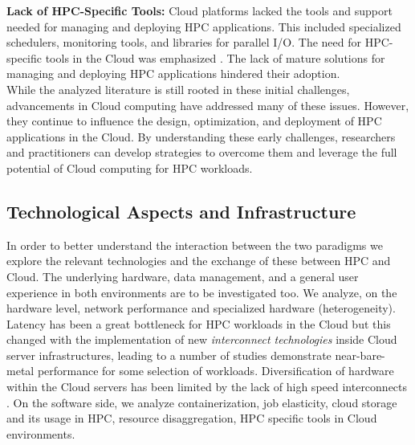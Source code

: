     \noindent
    \textbf{Lack of HPC-Specific Tools:} Cloud platforms lacked the tools and support needed for managing and deploying HPC applications. This included specialized schedulers, monitoring tools, and libraries for parallel I/O. The need for HPC-specific tools in the Cloud was emphasized \cite{yelick2011challenges, gupta2014challenges}. The lack of mature solutions for managing and deploying HPC applications hindered their adoption. \\

    While the analyzed literature is still rooted in these initial challenges, advancements in Cloud computing have addressed many of these issues. However, they continue to influence the design, optimization, and deployment of HPC applications in the Cloud. By understanding these early challenges, researchers and practitioners can develop strategies to overcome them and leverage the full potential of Cloud computing for HPC workloads.





\subsection{Technological Aspects and Infrastructure}
\label{sec:techinfrastructure}

    In order to better understand the interaction between the two paradigms we explore the relevant technologies and the exchange of these between HPC and Cloud. The underlying hardware, data management, and a general user experience in both environments are to be investigated too.
    We analyze, on the hardware level, network performance and specialized hardware (heterogeneity). Latency has been a great bottleneck for HPC workloads in the Cloud but this changed with the implementation of new \textit{interconnect technologies} inside Cloud server infrastructures, leading to a number of studies demonstrate near-bare-metal performance for some selection of workloads. Diversification of hardware within the Cloud servers has been limited by the lack of high speed interconnects \cite{alves_interference-aware_2020}\cite{michelogiannakis_case_2022}.
    On the software side, we analyze containerization, job elasticity, cloud storage and its usage in HPC, resource disaggregation, HPC specific tools in Cloud environments.





